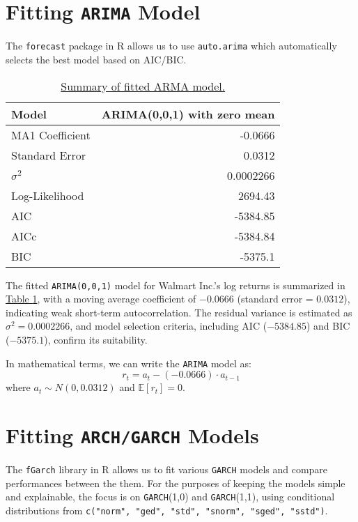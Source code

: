 \documentclass{article}
\newcommand{\1}{\mathbbm{1}}
\theoremstyle{definition}
\begin{document}
\section{Fitting \texttt{ARIMA} Model}

The \texttt{forecast} package in R allows us to use \texttt{auto.arima} which automatically selects the best model based on AIC/BIC.

\begin{table}[H]
\centering
\begin{tabular}{l|r}
\hline
\textbf{Model}  & \textbf{ARIMA(0,0,1) with zero mean} \\
\hline
MA1 Coefficient & -0.0666 \\
Standard Error  & 0.0312 \\
$\sigma^2$      & 0.0002266 \\
\hline
Log-Likelihood  & 2694.43 \\
AIC             & -5384.85 \\
AICc            & -5384.84 \\
BIC             & -5375.1 \\
\hline
\end{tabular}
\caption{\small{\hyperref[subsec:arma_model_summary]{Summary of fitted ARMA model.}}}
\label{tab:arma_model_summary}
\end{table}

The fitted \texttt{ARIMA(0,0,1)} model for Walmart Inc.'s log returns is summarized in \hyperref[tab:arma_model_summary]{Table \ref{tab:arma_model_summary}}, with a moving average coefficient of $-0.0666$ (standard error = $0.0312$), indicating weak short-term autocorrelation. The residual variance is estimated as $\sigma^2 = 0.0002266$, and model selection criteria, including AIC ($-5384.85$) and BIC ($-5375.1$), confirm its suitability.

In mathematical terms, we can write the \texttt{ARIMA} model as:
$$r_t = a_t - (-0.0666) \cdot a_{t-1}$$
where $a_t \sim N(0, 0.0312)$ and $\mathbb{E}[r_t] = 0$.


\section{Fitting \texttt{ARCH/GARCH} Models}

The \texttt{fGarch} library in R allows us to fit various \texttt{GARCH} models and compare performances between the them. For the purposes of keeping the models simple and explainable, the focus is on \texttt{GARCH}(1,0) and \texttt{GARCH}(1,1), using conditional distributions from \texttt{c("norm", "ged", "std", "snorm", "sged", "sstd")}.
\end{document}
